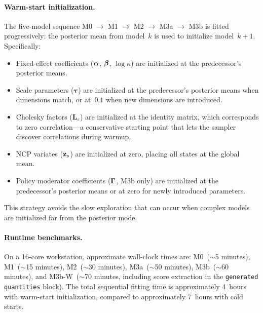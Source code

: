 \paragraph{Warm-start initialization.}
The five-model sequence M0 $\to$ M1 $\to$ M2 $\to$ M3a $\to$ M3b
is fitted progressively: the posterior mean from model~$k$ is used
to initialize model~$k+1$.  Specifically:
\begin{itemize}
  \item Fixed-effect coefficients ($\boldsymbol{\alpha}$, $\boldsymbol{\beta}$,
    $\log\kappa$) are initialized at the predecessor's posterior
    means.
  \item Scale parameters ($\boldsymbol{\tau}$) are initialized at the
    predecessor's posterior means when dimensions match, or at~$0.1$
    when new dimensions are introduced.
  \item Cholesky factors ($\mathbf{L}_\varepsilon$) are initialized at
    the identity matrix, which corresponds to zero correlation---a
    conservative starting point that lets the sampler discover
    correlations during warmup.
  \item NCP variates ($\mathbf{z}_s$) are initialized at zero, placing all
    states at the global mean.
  \item Policy moderator coefficients ($\boldsymbol{\Gamma}$, M3b only) are
    initialized at the predecessor's posterior means or at zero for
    newly introduced parameters.
\end{itemize}
This strategy avoids the slow exploration that can occur when complex
models are initialized far from the posterior mode.

\paragraph{Runtime benchmarks.}
On a 16-core workstation, approximate wall-clock times are:
M0~($\sim$5 minutes),
M1~($\sim$15 minutes),
M2~($\sim$30 minutes),
M3a~($\sim$50 minutes),
M3b~($\sim$60 minutes),
and M3b-W~($\sim$70 minutes, including score extraction in the
\texttt{generated quantities} block).  The total sequential fitting
time is approximately 4~hours with warm-start initialization, compared
to approximately 7~hours with cold starts.
